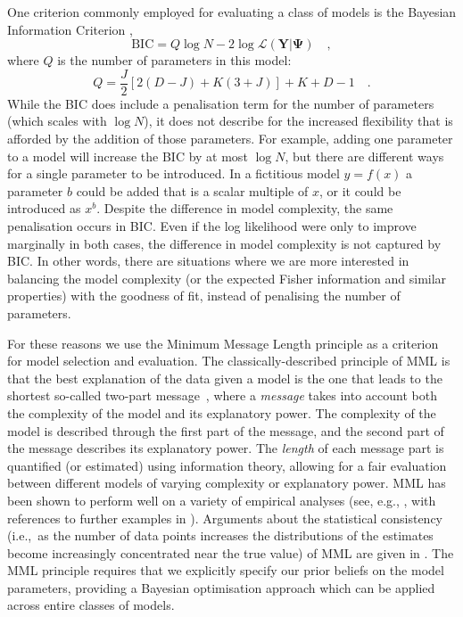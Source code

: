 \documentclass[twocolumn]{aastex62}
\newcommand{\vect}[1]{\boldsymbol{\mathbf{#1}}}
\renewcommand{\vec}[1]{\vect{#1}}
\newcommand{\data}{\textbf{Y}}
\newcommand{\NumDimensions}{D}
\newcommand{\NumLatentFactors}{J}
\newcommand{\NumComponents}{K}
\begin{document}
One criterion commonly employed for evaluating a class of models is the 
Bayesian Information Criterion \citep[BIC;][]{Schwarz:1978}, 
\begin{equation}
	\textrm{BIC} = Q\log{N} - 2\log\mathcal{L}\left(\data|\vec\Psi\right) \quad , \label{eq:bic}
\end{equation} 
\noindent{}where $Q$ is the number of parameters in this model:
\begin{equation}
	Q = \frac{\NumLatentFactors}{2}\left[2\left(\NumDimensions - \NumLatentFactors\right) + \NumComponents\left(3 + \NumLatentFactors\right)\right] + \NumComponents + \NumDimensions - 1 \quad .
\end{equation}
\noindent{}While the BIC does include a penalisation term for the number of
parameters (which scales with $\log{N}$), it does not describe for the
increased flexibility that is afforded by the addition of those parameters.
For example, adding one parameter
to a model will increase the BIC by at most $\log{N}$, but there are different
ways for a single parameter to be introduced. In a fictitious model $y=f(x)$
a parameter $b$ could be added that is a scalar multiple of $x$, or it could be
introduced as $x^b$. Despite the difference in model complexity, the same
penalisation occurs in BIC. Even if the log likelihood were only to improve
marginally in both cases, the difference in model complexity is not captured
by BIC. In other words, there are situations where we are more interested in
balancing the model complexity (or the expected Fisher information and similar
properties) with the goodness of fit, instead of penalising the number of 
parameters.


For these reasons we use the Minimum Message Length \citep[MML;][]{Wallace:2005}
principle as a criterion for model selection and evaluation. 
The classically-described principle of MML is that the best explanation of the
data given a model is the one that leads to the shortest so-called two-part message~\citep{Wallace:2005}, 
where a \textit{message} takes into account both the complexity of the model 
and its explanatory power. The complexity of the model is described through
the first part of the message, and the second part of the message describes
its explanatory power. The \emph{length} of each message part is quantified
(or estimated) using information theory, allowing for a fair evaluation between
different models of varying complexity or explanatory power. MML has been 
shown to perform well on a variety of empirical analyses (see, e.g., 
\cite{viswanathan1999finding,fitzgibbon2004minimum}, with references to 
further examples in \cite{Wallace:2005,dowe2007bayes,Dowe2008a,Dowe2011a}).
Arguments about the statistical consistency (i.e.,~as the number of data 
points increases the distributions of the estimates become increasingly 
concentrated near the true value) of MML are given in \cite{DoweWallace1997a,Dowe2011a}.
The MML principle requires that we explicitly specify our prior beliefs on the
model parameters, providing a Bayesian optimisation approach which can be
applied across entire classes of models.
\end{document}
